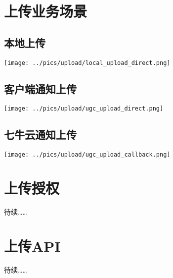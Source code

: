 \documentclass[11pt, oneside]{book}
\newcommand{\qpara}[1]{
\vspace{0.3em}
\noindent
#1\par
\vspace{0.3em}
}
\begin{document}
\chapter{上传业务场景}

\section{本地上传}

\begin{center}
\texttt{[image: ../pics/upload/local\_upload\_direct.png]}
\end{center}

\section{客户端通知上传}

\begin{center}
\texttt{[image: ../pics/upload/ugc\_upload\_direct.png]}
\end{center}

\section{七牛云通知上传}

\begin{center}
\texttt{[image: ../pics/upload/ugc\_upload\_callback.png]}
\end{center}

\chapter{上传授权}

\qpara{待续……}

\chapter{上传API}

\qpara{待续……}
\end{document}
